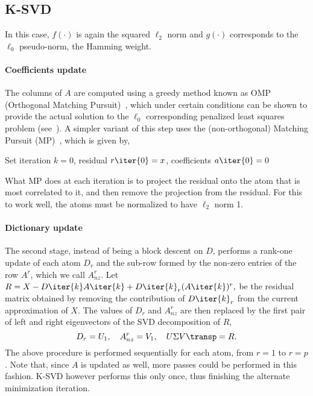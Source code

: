 \documentclass[twocolumn]{IEEEtran}
\begin{document}
\subsection{K-SVD} 

In this case, $f(\cdot)$ is again the squared $\ell_2$ norm and $g(\cdot)$ corresponds to the $\ell_0$ pseudo-norm, the Hamming weight. 

\paragraph{Coefficients update} The columns of $A$ are computed using a greedy method known as OMP (Orthogonal Matching Pursuit)~\cite{omp}, which   under certain conditions can be shown to provide the actual solution to the $\ell_0$ corresponding penalized least squares problem (see~\cite{tropp04?}). A simpler variant of this step uses the (non-orthogonal) Matching Pursuit (MP)~\cite{mp}, which is given by, 
\begin{algorithm}[ht]
Set iteration $k=0$, residual $r\iter{0}=x$, coefficients $a\iter{0}=0$\;
\label{alg:omp}
\end{algorithm}
What MP does at each iteration is to project the residual onto the atom that is most correlated to it, and then remove the projection from the residual. For this to work well, the atoms must be normalized to have $\ell_2$ norm 1.

\paragraph{Dictionary update} The second stage, instead of being a block descent on $D$, performs a rank-one update of each atom $D_r$ and the sub-row formed by the non-zero entries of the row $A^r$, which we call $A^r_{nz}$. Let $R = X - D\iter{k}A\iter{k} + D\iter{k}_r(A\iter{k})^r,$ be the residual matrix obtained by removing the contribution of $D\iter{k}_r$ from the current approximation of $X$. The values of $D_r$ and $A_{nz}^r$ are then replaced by the first pair of left and right eigenvectors of the SVD decomposition of $R$, 
\begin{equation}
D_r = U_1,\quad A_{nz}^r=V_1,\quad U\Sigma V\transp=R.
\label{eq:ksvd3}
\end{equation}
The above procedure is performed sequentially for each atom, from $r=1$ to $r=p$. Note that, since $A$ is updated as well, more passes could be performed in this fashion. K-SVD however performs this only once, thus finishing the alternate minimization iteration.
\end{document}
